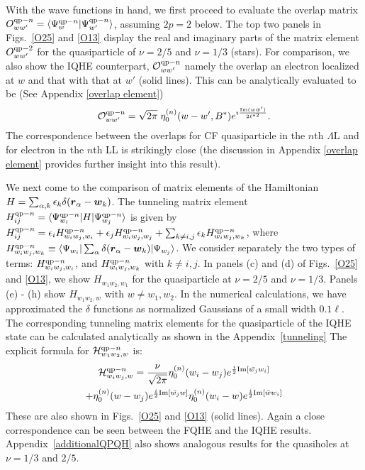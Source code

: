 \documentclass[twocolumn,floatfix,prb,aps,showpacs]{revtex4-2}
\newcommand{\IO}{\mathcal{O}}
\newcommand{\IH}{\mathcal{H}}
\renewcommand{\vec}[1]{\mbox{\boldmath$#1$}}
\begin{document}
With the wave functions in hand, we first proceed to evaluate the overlap matrix $O^{{\rm qp}-n}_{ww'}=\langle \Psi_w^{{\rm qp}-n}|\Psi_{w'}^{{\rm qp}-n}\rangle$, assuming $2p=2$ below. 
The top two panels in Figs.~\ref{O25} and \ref{O13} display the real and imaginary parts of the matrix element $O^{{\rm qp}-2}_{ww'}$ for the quasiparticle of $\nu=2/5$ and $\nu=1/3$ (stars). For comparison, we also show the IQHE counterpart, 
$\IO^{\rm qp-n}_{ww'}$ 
namely the overlap an electron localized at $w$ and that with that at $w'$ (solid lines). This can be analytically evaluated to be (See Appendix \ref{overlap element})
\begin{equation}
\IO^{\rm qp-n}_{ww'} = \sqrt{2\pi}\;\eta_{0}^{(n)} (w-w',B^*)e^{\imath \frac{{\rm Im}(w\bar{w}')}{2\ell^{*2}}}.
\end{equation}
The correspondence between the overlaps for CF quasiparticle in the $n$th $\Lambda$L and for electron in the $n$th LL is strikingly close (the discussion in Appendix \ref{overlap element} provides further insight into this result). 



We next come to the comparison of matrix elements of the Hamiltonian 
$H=\sum_{\alpha,k} \epsilon_k \delta(\vec{r}_\alpha-\vec{w}_k)$.  
%
The tunneling matrix element $H^{{\rm qp}-n}_{ij}=\langle\Psi^{{\rm qp}-n}_{w_i} | H
|\Psi^{{\rm qp}-n}_{w_j} \rangle$ is given by $H^{{\rm qp}-n}_{ij}=\epsilon_i H^{{\rm qp}-n}_{w_iw_j,w_i}+\epsilon_j H^{{\rm qp}-n}_{w_iw_j,w_j}+\sum_{k\neq i,j} \epsilon_k H^{{\rm qp}-n}_{w_iw_j,w_k}$, where $H^{{\rm qp}-n}_{w_i w_j,w_k}\equiv \langle\Psi_{w_i} | \sum_{\alpha}\delta(\vec{r}_\alpha-\vec{w}_k)|\Psi_{w_j}\rangle$. We consider separately the two types of terms: $H^{{\rm qp}-n}_{w_iw_j,w_i}$, and $H^{{\rm qp}-n}_{w_iw_j,w_k}$ with $k\neq i,j$. 
In panels (c) and (d) of Figs.~\ref{O25} and \ref{O13}, we show $H_{w_1w_2,w_1}$ for the quasiparticle at $\nu=2/5$ and $\nu=1/3$. Panels (e) - (h) show $H_{w_1 w_2,w}$ with $w\neq w_1,w_2$. In the numerical calculations, we have approximated the $\delta$ functions as normalized Gaussians of a small width $0.1\ell$. 
The corresponding tunneling matrix elements for the quasiparticle of the IQHE state can be calculated analytically as shown in the Appendix~\ref{tunneling} The explicit formula for $\IH^{{\rm qp}-n}_{w_1w_2,w}$ is:
\begin{multline}
\label{tunneling element}
\IH^{{\rm qp}-n}_{w_i w_j,w}={\nu\over \sqrt{2\pi}}\eta_0^{(n)}(w_i-w_j)e^{{i\over 2}{\rm Im}[\bar{w_j}w_i]}\\ 
+\eta_0^{(n)}(w-w_j)e^{{i\over 2}{\rm Im}[\bar{w_j}w]}\eta_0^{(n)}(w_i-w)e^{{i\over 2}{\rm Im}[\bar{w}w_i]}
\end{multline}
These are also shown in Figs.~\ref{O25} and \ref{O13} (solid lines). Again a close correspondence can be seen between the FQHE and the IQHE results. Appendix~\ref{additionalQPQH} also shows analogous results for the quasiholes at $\nu=1/3$ and $2/5$.  
\end{document}
